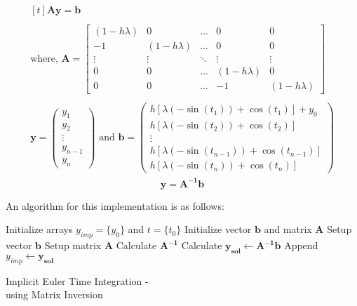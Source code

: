 \begin{gather}\label{eq113}
\begin{gathered}[t]
\mathbf{A} \mathbf{y} = \mathbf{b}\\ \\ 
\text{where, } \mathbf{A} = 
\begin{bmatrix}
           (1 - h\lambda) & 0 & \ldots & 0 & 0\\
           -1 & (1 - h\lambda) & \ldots & 0 & 0\\
           \vdots & \vdots & \ddots & \vdots & \vdots\\
           0 & 0 & \ldots & (1 - h\lambda) & 0\\
           0 & 0 & \ldots & -1 & (1 - h\lambda)
\end{bmatrix} \\ \\
\mathbf{y} =
\begin{pmatrix}
           y_{1}\\
           y_{2}\\
           \vdots \\
           y_{n-1}\\
           y_{n}
\end{pmatrix} \text{ and } 
\mathbf{b}=
\begin{pmatrix}
           h [\lambda (-\sin(t_1)) + \cos(t_1)] + y_0\\
           h [\lambda (-\sin(t_2)) + \cos(t_2)]\\
           \vdots \\
           h [\lambda (-\sin(t_{n-1})) + \cos(t_{n-1})]\\
           h [\lambda (-\sin(t_n)) + \cos(t_n)]
\end{pmatrix} 
\end{gathered}
\end{gather}
\begin{equation}
\label{eq114}
\mathbf{y} = \mathbf{A^{-1}} \mathbf{b}
\end{equation}

An algorithm for this implementation is as follows:
\begin{center}
\smallskip
\begin{minipage}{.7\linewidth}
    \begin{algorithm}[H]
      \SetAlgoLined
      Initialize arrays $y_{imp}=\{y_0\}$ and $t=\{t_0\}$\;
	  Initialize vector $\mathbf{b}$ and matrix $\mathbf{A}$\;    
      Setup vector $\mathbf{b}$\; \; 
      Setup matrix $\mathbf{A}$\;
      Calculate $\mathbf{A^{-1}}$\;
      Calculate $\mathbf{y_{sol}} \gets \mathbf{A^{-1}} \mathbf{b}$\;
      Append $y_{imp} \gets \mathbf{y_{sol}}$\;
     \caption{Implicit Euler Time Integration - \\
     using Matrix Inversion}
	\label{algo:imp_euler_matrix}
    \end{algorithm}
  \end{minipage}
\end{center}

